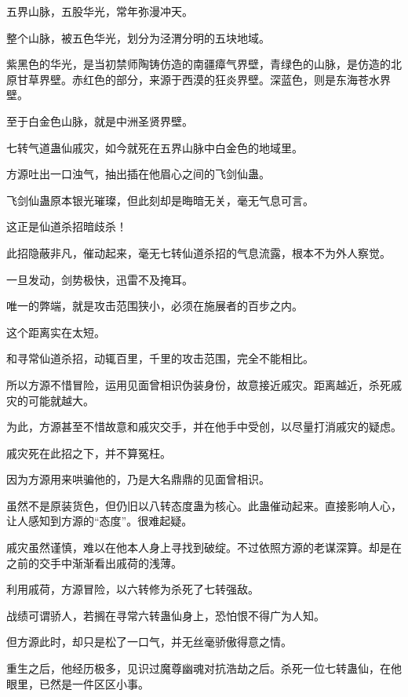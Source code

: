 
\begin{this_body}



五界山脉，五股华光，常年弥漫冲天。

整个山脉，被五色华光，划分为泾渭分明的五块地域。

紫黑色的华光，是当初禁师陶铸仿造的南疆瘴气界壁，青绿色的山脉，是仿造的北原甘草界壁。赤红色的部分，来源于西漠的狂炎界壁。深蓝色，则是东海苍水界壁。

至于白金色山脉，就是中洲圣贤界壁。

七转气道蛊仙戚灾，如今就死在五界山脉中白金色的地域里。

方源吐出一口浊气，抽出插在他眉心之间的飞剑仙蛊。

飞剑仙蛊原本银光璀璨，但此刻却是晦暗无关，毫无气息可言。

这正是仙道杀招暗歧杀！

此招隐蔽非凡，催动起来，毫无七转仙道杀招的气息流露，根本不为外人察觉。

一旦发动，剑势极快，迅雷不及掩耳。

唯一的弊端，就是攻击范围狭小，必须在施展者的百步之内。

这个距离实在太短。

和寻常仙道杀招，动辄百里，千里的攻击范围，完全不能相比。

所以方源不惜冒险，运用见面曾相识伪装身份，故意接近戚灾。距离越近，杀死戚灾的可能就越大。

为此，方源甚至不惜故意和戚灾交手，并在他手中受创，以尽量打消戚灾的疑虑。

戚灾死在此招之下，并不算冤枉。

因为方源用来哄骗他的，乃是大名鼎鼎的见面曾相识。

虽然不是原装货色，但仍旧以八转态度蛊为核心。此蛊催动起来。直接影响人心，让人感知到方源的“态度”。很难起疑。

戚灾虽然谨慎，难以在他本人身上寻找到破绽。不过依照方源的老谋深算。却是在之前的交手中渐渐看出戚荷的浅薄。

利用戚荷，方源冒险，以六转修为杀死了七转强敌。

战绩可谓骄人，若搁在寻常六转蛊仙身上，恐怕恨不得广为人知。

但方源此时，却只是松了一口气，并无丝毫骄傲得意之情。

重生之后，他经历极多，见识过魔尊幽魂对抗浩劫之后。杀死一位七转蛊仙，在他眼里，已然是一件区区小事。


\end{this_body}
